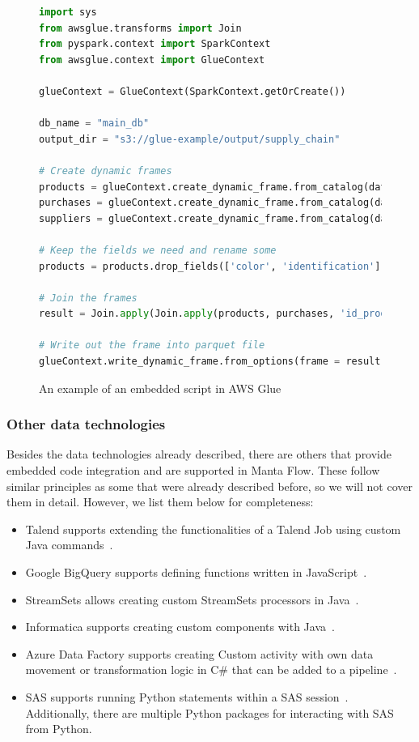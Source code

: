 \begin{figure}[ht]
\begin{lstlisting}[language=Python]
import sys
from awsglue.transforms import Join
from pyspark.context import SparkContext
from awsglue.context import GlueContext

glueContext = GlueContext(SparkContext.getOrCreate())

db_name = "main_db"
output_dir = "s3://glue-example/output/supply_chain"

# Create dynamic frames
products = glueContext.create_dynamic_frame.from_catalog(database=db_name, table_name="products_json")
purchases = glueContext.create_dynamic_frame.from_catalog(database=db_name, table_name="purchases_json")
suppliers = glueContext.create_dynamic_frame.from_catalog(database=db_name, table_name="suppliers_json")

# Keep the fields we need and rename some
products = products.drop_fields(['color', 'identification']).rename_field('name', 'product_name')

# Join the frames
result = Join.apply(Join.apply(products, purchases, 'id_product', 'product_id'), suppliers, 'supplier_id', 'id_supplier')

# Write out the frame into parquet file
glueContext.write_dynamic_frame.from_options(frame = result, connection_type = "s3", connection_options = {"path": output_dir}, format = "parquet")
\end{lstlisting}
\caption{An example of an embedded script in AWS Glue}
\label{fig:embeddedScript}
\end{figure}

\subsubsection{Other data technologies}
Besides the data technologies already described, there are others that provide embedded code integration and are supported in Manta Flow. These follow similar principles as some that were already described before, so we will not cover them in detail. However, we list them below for completeness:
\begin{itemize}
    \item Talend supports extending the functionalities of a Talend Job using custom Java commands~\cite{talend}.
    \item Google BigQuery supports defining functions written in JavaScript~\cite{bigquery}.
    \item StreamSets allows creating custom StreamSets processors in Java~\cite{streamsets}.
    \item Informatica supports creating custom components with Java~\cite{informatica}.
    \item Azure Data Factory supports creating Custom activity with own data movement or transformation logic in C\# that can be added to a pipeline~\cite{adf}.
    \item SAS supports running Python statements within a SAS session~\cite{sas}. Additionally, there are multiple Python packages for interacting with SAS from Python.
\end{itemize}


